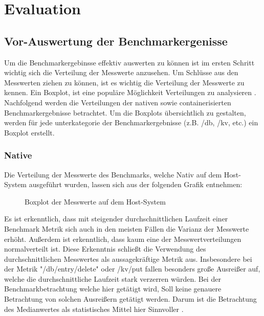 \chapter{Evaluation}

\section{Vor-Auswertung der Benchmarkergenisse}

Um die Benchmarkergebinsse effektiv auswerten zu können ist im ersten Schritt wichtig sich die Verteilung der Messwerte anzusehen. Um Schlüsse aus den Messwerten ziehen zu können, ist es wichtig die Verteilung der Messwerte zu kennen. Ein Boxplot, ist eine populäre Möglichkeit Verteilungen zu analysieren \cite[Vgl. 1]{majawExploringDataDistributions2023}. Nachfolgend werden die Verteilungen der nativen sowie containerisierten Benchmarkergebnisse betrachtet. Um die Boxplots übersichtlich zu gestalten, werden für jede unterkategorie der Benchmarkergebnisse (z.B. /db, /kv, etc.) ein Boxplot erstellt. 

\subsection{Native}

Die Verteilung der Messwerte des Benchmarks, welche Nativ auf dem Host-System ausgeführt wurden, lassen sich aus der folgenden Grafik entnehmen:

\begin{figure}[!h]
    \centering
    
    \caption{Boxplot der Messwerte auf dem Host-System}
    \label{fig:boxplot_native}
\end{figure}

\FloatBarrier

Es ist erkenntlich, dass mit steigender durchschnittlichen Laufzeit einer Benchmark Metrik sich auch in den meisten Fällen die Varianz der Messwerte erhöht. Außerdem ist erkenntlich, dass kaum eine der Messwertverteilungen normalverteilt ist. Diese Erkenntnis schließt die Verwendung des durchschnittlichen Messwertes als aussagekräftige Metrik aus. Insbesondere bei der Metrik "/db/entry/delete" oder /kv/put fallen besonders große Ausreißer auf, welche die durchschnittliche Laufzeit stark verzerren würden. Bei der Benchmarkbetrachtung welche hier getätigt wird, Soll keine genauere Betrachtung von solchen Ausreißern getätigt werden. Darum ist die Betrachtung des Medianwertes als statistisches Mittel hier Sinnvoller \cite[Vgl. 15f.]{stengelStatistikUndAufbereitung2011}. 

